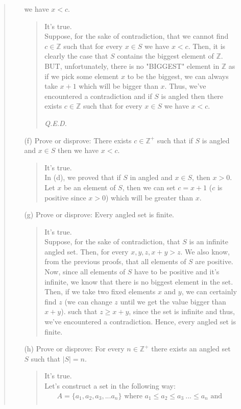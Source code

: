 \documentclass[12pt, a4paper]{article}                      %
\begin{document}
\begin{enumerate}
\begin{quote}
\begin{itemize}
we have $x < c$.
\begin{quote}
It's true.\\
Suppose, for the sake of contradiction, that we cannot find $c \in \mathbb{Z}$ such that
for every $x \in S$ we have $x < c$. Then, it is clearly the case that $S$ contains
the biggest element of $\mathbb{Z}$. BUT, unfortunately, there is no "BIGGEST" element
in $\mathbb{Z}$ as if we pick some element $x$ to be the biggest, we can always take $x + 1$
which will be bigger than $x$. Thus, we've encountered a contradiction and if $S$ is angled then there exists $c \in \mathbb{Z}$ such that for every $x \in S$
we have $x < c$.
\begin{flushright}
\textit{Q.E.D.}
\end{flushright}
\end{quote}
\item[(f)]
Prove or disprove: There exists $c \in \mathbb{Z}^+$ such that
if $S$ is angled and $x \in S$ then we have $x < c$.
\begin{quote}
It's true.\\
In (d), we proved that if $S$ in angled and $x \in S$, then $x > 0$.
Let $x$ be an element of $S$, then we can set $c = x + 1$ ($c$ is positive
since $x > 0$) which will be greater than $x$.
\end{quote}
\item[(g)]
Prove or disprove: Every angled set is finite.
\begin{quote}
It's true.\\
Suppose, for the sake of contradiction, that $S$ is an infinite angled set.
Then, for every $x, y, z, x + y > z$. We also know, from the previous proofs,
that all elements of $S$ are positive. Now, since all elements of $S$ have to
be positive and it's infinite, we know that there is no biggest element in the
set. Then, if we take two fixed elements $x$ and $y$, we can certainly find $z$
(we can change $z$ until we get the value bigger than $x + y$).
such that $z \geq x + y$, since the set is infinite and thus, we've encountered a
contradiction. Hence, every angled set is finite.
\end{quote}
\item[(h)]
Prove or disprove: For every $n \in \mathbb{Z}^+$ there exists an angled set $S$ such that $|S| = n$.
\begin{quote}
It's true.\\
Let's construct a set in the following way:\\
\begin{align*}
A = \{a_1, a_2, a_3, ... a_n\} \mbox{ where } a_1 \leq a_2 \leq a_3 \ ... \leq a_n \mbox{ and }\\

\end{align*}
\end{quote}
\end{itemize}
\end{quote}
\end{enumerate}
\end{document}
